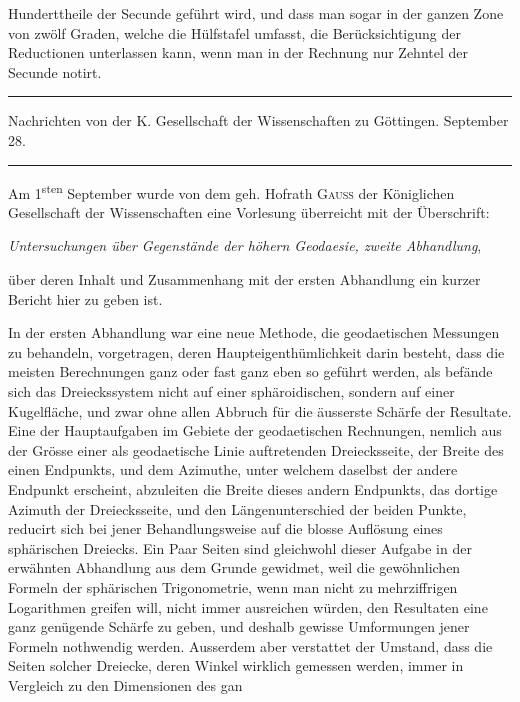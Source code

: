 %
Hunderttheile der Secunde geführt wird, und dass man sogar in der ganzen Zone von zwölf Graden, welche die Hülfstafel umfasst, die Berücksichtigung der Reductionen unterlassen kann, wenn man in der Rechnung nur Zehntel der Secunde notirt.

\begin{center}
\rule{.85\textwidth}{.3pt}\par
Nachrichten von der K. Gesellschaft der Wissenschaften zu Göttingen. September 28.\par
\rule{.85\textwidth}{.3pt}
\end{center}
\hspace*{\parindent}Am 1\textsuperscript{sten} September wurde von dem geh. Hofrath \textsc{Gauss} der Königlichen Gesellschaft der Wissenschaften eine Vorlesung überreicht mit der Überschrift:
\begin{center}\textit{Untersuchungen über Gegenstände der höhern Geodaesie, zweite Abhandlung},\end{center}
\noindent über deren Inhalt und Zusammenhang mit der ersten Abhandlung ein kurzer Bericht hier zu geben ist.

In der ersten Abhandlung war eine neue Methode, die geodaetischen Messungen zu behandeln, vorgetragen, deren Haupteigenthümlichkeit darin besteht, dass die meisten Berechnungen ganz oder fast ganz eben so geführt werden, als befände sich das Dreieckssystem nicht auf einer sphäroidischen, sondern auf einer Kugelfläche, und zwar ohne allen Abbruch für die äusserste Schärfe der Resultate. Eine der Hauptaufgaben im Gebiete der geodaetischen Rechnungen, nemlich aus der Grösse einer als geodaetische Linie auftretenden Dreiecksseite, der Breite des einen Endpunkts, und dem Azimuthe, unter welchem daselbst der andere Endpunkt erscheint, abzuleiten die Breite dieses andern Endpunkts, das dortige Azimuth der Dreiecksseite, und den Längenunterschied der beiden Punkte, reducirt sich bei jener Behandlungsweise auf die blosse Auflösung eines sphärischen Dreiecks. Ein Paar Seiten sind gleichwohl dieser Aufgabe in der erwähnten Abhandlung aus dem Grunde gewidmet, weil die gewöhnlichen Formeln der sphärischen Trigonometrie, wenn man nicht zu mehrziffrigen Logarithmen greifen will, nicht immer ausreichen würden, den Resultaten eine ganz genügende Schärfe zu geben, und deshalb gewisse Umformungen jener Formeln nothwendig werden. Ausserdem aber verstattet der Umstand, dass die Seiten solcher Dreiecke, deren Winkel wirklich gemessen werden, immer in Vergleich zu den Dimensionen des gan%
